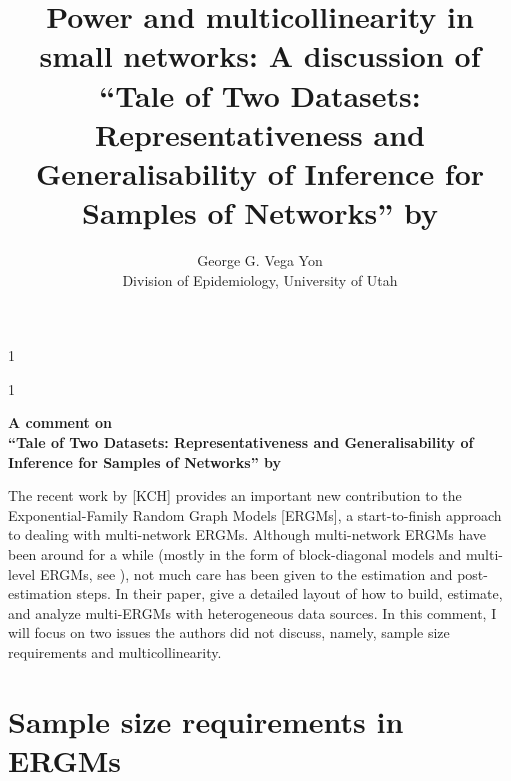 \documentclass[12pt]{article}
\newcommand{\blind}{0}
\begin{document}
%

\def\spacingset#1{\renewcommand{\baselinestretch}%
{#1}\small\normalsize} \spacingset{1}



\def\blind{1}

\blind
{
  \title{\bf Power and multicollinearity in small networks: A discussion of\\``Tale of Two Datasets: Representativeness
  and Generalisability of Inference for Samples of Networks'' by \citeauthor*{krivitskyTaleTwoDatasets2022}}
  \author{George G. Vega Yon\hspace{.2cm}\\%
    Division of Epidemiology, University of Utah
    }
  \maketitle
} \fi

\blind
{ 
  \bigskip
  \bigskip
  \bigskip
  \begin{center}
    {\LARGE\bf A comment on\\``Tale of Two Datasets: Representativeness
    and Generalisability of Inference for Samples of Networks'' by \citeauthor*{krivitskyTaleTwoDatasets2022}}
\end{center}
  \medskip
} \fi

\spacingset{1.9} %

The recent work by \citeauthor*{krivitskyTaleTwoDatasets2022} [KCH] provides an important new contribution to the Exponential-Family Random Graph Models [ERGMs], a start-to-finish approach to dealing with multi-network ERGMs. Although multi-network ERGMs have been around for a while (mostly in the form of block-diagonal models and multi-level ERGMs, see \cite{duxburyScalingBiasPooled2023,wangExponentialRandomGraph2013, slaughterMultilevelModelsSocial2016}), not much care has been given to the estimation and post-estimation steps. In their paper, \citeauthor*{krivitskyTaleTwoDatasets2022} give a detailed layout of how to build, estimate, and analyze multi-ERGMs with heterogeneous data sources. In this comment, I will focus on two issues the authors did not discuss, namely, sample size requirements and multicollinearity. 


\section{Sample size requirements in ERGMs}
\end{document}
